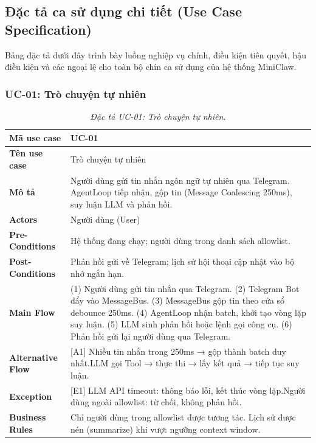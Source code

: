 \subsection{Đặc tả ca sử dụng chi tiết (Use Case Specification)}
Bảng đặc tả dưới đây trình bày luồng nghiệp vụ chính, điều kiện tiên quyết, hậu điều kiện và các ngoại lệ cho toàn bộ chín ca sử dụng của hệ thống MiniClaw.

\subsubsection{UC-01: Trò chuyện tự nhiên}
\label{subsec:spec-uc01}
\renewcommand{\arraystretch}{1.4}
\begin{longtable}{|>{\bfseries}p{3.5cm}|p{10.5cm}|}
  \caption{\emph{Đặc tả UC-01: Trò chuyện tự nhiên.}} \label{tab:spec-uc01} \\
  \hline
  Mã use case      & UC-01 \\ \hline
  Tên use case     & Trò chuyện tự nhiên \\ \hline
  Mô tả            & Người dùng gửi tin nhắn ngôn ngữ tự nhiên qua Telegram. AgentLoop tiếp nhận, gộp tin (Message Coalescing 250ms), suy luận LLM và phản hồi. \\ \hline
  Actors           & Người dùng (User) \\ \hline
  Pre-Conditions   & Hệ thống đang chạy; người dùng trong danh sách allowlist. \\ \hline
  Post-Conditions  & Phản hồi gửi về Telegram; lịch sử hội thoại cập nhật vào bộ nhớ ngắn hạn. \\ \hline
  Main Flow        & (1) Người dùng gửi tin nhắn qua Telegram.\newline
                     (2) Telegram Bot đẩy vào MessageBus.\newline
                     (3) MessageBus gộp tin theo cửa sổ debounce 250ms.\newline
                     (4) AgentLoop nhận batch, khởi tạo vòng lặp suy luận.\newline
                     (5) LLM sinh phản hồi hoặc lệnh gọi công cụ.\newline
                     (6) Phản hồi gửi lại người dùng qua Telegram. \\ \hline
  Alternative Flow & [A1] Nhiều tin nhắn trong 250ms → gộp thành batch duy nhất.\newline
                     [A2] LLM gọi Tool → thực thi → lấy kết quả → tiếp tục suy luận. \\ \hline
  Exception        & [E1] LLM API timeout: thông báo lỗi, kết thúc vòng lặp.\newline
                     [E2] Người dùng ngoài allowlist: từ chối, không phản hồi. \\ \hline
  Business Rules   & Chỉ người dùng trong allowlist được tương tác.\newline
                     Lịch sử được nén (summarize) khi vượt ngưỡng context window. \\ \hline
\end{longtable}

